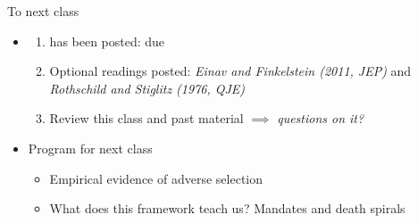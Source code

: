\begin{frame}{To next class}
\begin{itemize}
    \item {}
    \begin{enumerate}
        \item {} has been posted: due 
        \item Optional readings posted: \textit{Einav and Finkelstein (2011, JEP)} and \textit{Rothschild and Stiglitz (1976, QJE)}
        \item Review this class and past material $\implies$ \textit{questions on it?}
    \end{enumerate}
    \vspace{5mm}

    \item Program for next class
    \begin{itemize}
        \item Empirical evidence of adverse selection
        \item What does this framework teach us? Mandates and death spirals
    \end{itemize}
\end{itemize}
\end{frame}
